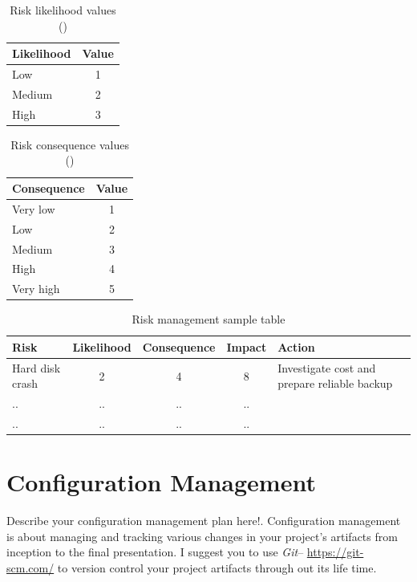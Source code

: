\documentclass[12pt, a4paper]{report}
\begin{document}
\begin{table}[htb!]
  \centering
\begin{tabular}{l|c}
  \bf{Likelihood} & \bf{Value}\\ \hline\hline
  Low & 1 \\ \hline
  Medium & 2 \\ \hline
  High & 3 \\ \hline
\end{tabular}
  \caption{Risk likelihood values (\cite{dawson2005projects})}
  \label{tab:likelihood}
\end{table}

\begin{table}[htb!]
  \centering
\begin{tabular}{l|c}
  \bf{Consequence} & \bf{Value} \\ \hline\hline
  Very low & 1 \\ \hline
  Low & 2 \\ \hline
  Medium & 3 \\ \hline
  High & 4 \\ \hline
  Very high & 5 \\ \hline
\end{tabular}
  \caption{Risk consequence values (\cite{dawson2005projects})}
  \label{tab:consequence}
\end{table}


\begin{table}[htb!]
	\centering
\begin{tabular}{l|c|c|c|p{4cm}}
	\bf{Risk} & \bf{Likelihood} &\bf{Consequence} &\bf{Impact} &\bf{Action}\\ \hline\hline
Hard disk crash & 2 & 4 & 8 & Investigate cost and prepare reliable backup\\ \hline
.. & .. & .. & .. \\ \hline
.. & .. & .. & ..\\ \hline
\end{tabular}
  \caption{Risk management sample table}
  \label{tab:risk_impact}
\end{table}

\chapter{Configuration Management} %
\label{cha:configuration_management}
Describe your configuration management plan here!. Configuration management is about managing and tracking various changes in your project's artifacts from inception to the final presentation. I suggest you to use \emph{Git}-- \url{https://git-scm.com/} to version control your project artifacts through out its life time. 
\end{document}
